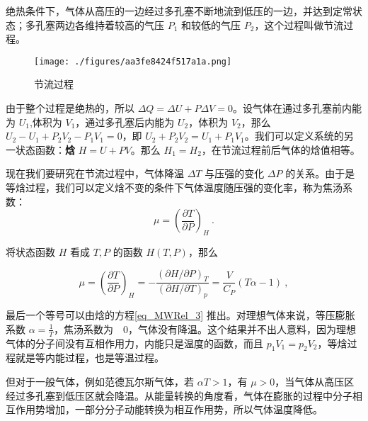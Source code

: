 

绝热条件下，气体从高压的一边经过多孔塞不断地流到低压的一边，并达到定常状态；多孔塞两边各维持着较高的气压 $P_1$ 和较低的气压 $P_2$，这个过程叫做节流过程。

\begin{figure}[ht]
\centering
\texttt{[image: ./figures/aa3fe8424f517a1a.png]}
\caption{节流过程} \label{fig_ttpro_1}
\end{figure}

由于整个过程是绝热的，所以 $\Delta Q=\Delta U+P\Delta V=0$。设气体在通过多孔塞前内能为 $U_1$,体积为 $V_1$，通过多孔塞后内能为 $U_2$，体积为 $V_2$，那么 $U_2-U_1+P_2V_2-P_1V_1=0$，即 $U_2+P_2V_2=U_1+P_1V_1$。我们可以定义系统的另一状态函数：\textbf{焓} $H=U+PV$。那么 $H_1=H_2$，在节流过程前后气体的焓值相等。

现在我们要研究在节流过程中，气体降温 $\Delta T$ 与压强的变化 $\Delta P$ 的关系。由于是等焓过程，我们可以定义焓不变的条件下气体温度随压强的变化率，称为焦汤系数：
\begin{equation}
\mu=\left(\frac{\partial T}{\partial P}\right)_H~.
\end{equation}

将状态函数 $H$ 看成 $T,P$ 的函数 $H(T,P)$，那么

\begin{equation}
\mu=\left(\frac{\partial T}{\partial P}\right)_H=
-\frac{(\partial H/\partial P)_T}{(\partial H/\partial T)_p}
=\frac{V}{C_P}(T\alpha-1)~,
\end{equation}

最后一个等号可以由焓的方程\autoref{eq_MWRel_3} 推出。对理想气体来说，等压膨胀系数 $\alpha=\frac{1}{T}$，焦汤系数为　$0$，气体没有降温。这个结果并不出人意料，因为理想气体的分子间没有互相作用力，内能只是温度的函数，而且 $p_1V_1=p_2V_2$，等焓过程就是等内能过程，也是等温过程。

但对于一般气体，例如范德瓦尔斯气体，若 $\alpha T>1$，有 $\mu>0$，当气体从高压区经过多孔塞到低压区就会降温。从能量转换的角度看，气体在膨胀的过程中分子相互作用势增加，一部分分子动能转换为相互作用势，所以气体温度降低。
